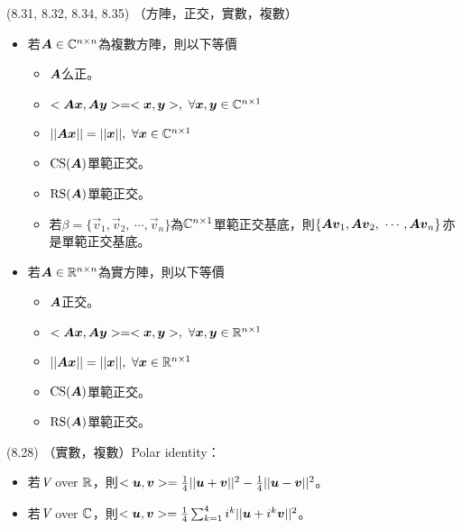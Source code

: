 \item \begin{theorem}{(8.31, 8.32, 8.34, 8.35)} （方陣，正交，實數，複數）
	\begin{itemize}
		\item 若$\boldsymbol{A} \in \mathbb{C}^{n \times n}$為複數方陣，則以下等價
		\begin{itemize}
			\item $\boldsymbol{A}$么正。
			\item $<\boldsymbol{A}\boldsymbol{x}, \boldsymbol{A}\boldsymbol{y}> = <\boldsymbol{x}, \boldsymbol{y}>, \ \forall \boldsymbol{x}, \boldsymbol{y} \in \mathbb{C}^{n \times 1}$
			\item $||\mat{A}\vec{x}|| = ||\vec{x}||, \ \forall \vec{x} \in \C^{n \times 1}$
			\item $\operatorname{CS}(\boldsymbol{A})$單範正交。
			\item $\operatorname{RS}(\boldsymbol{A})$單範正交。
			\item 若$\beta = \{\vec{v}_1, \vec{v}_2, \ \cdots, \vec{v}_n\}$為$\mathbb{C}^{n \times 1}$單範正交基底，則$\{\boldsymbol{A}\boldsymbol{v}_1, \boldsymbol{A}\boldsymbol{v}_2, \ \cdots, \boldsymbol{A}\boldsymbol{v}_n\}$亦是單範正交基底。			\end{itemize}
		\item 若$\boldsymbol{A} \in \mathbb{R}^{n \times n}$為實方陣，則以下等價
		\begin{itemize}
			\item $\boldsymbol{A}$正交。
			\item $<\boldsymbol{A}\boldsymbol{x}, \boldsymbol{A}\boldsymbol{y}> = <\boldsymbol{x}, \boldsymbol{y}>, \ \forall \boldsymbol{x}, \boldsymbol{y} \in \mathbb{R}^{n \times 1}$
			\item $||\mat{A}\vec{x}|| = ||\vec{x}||, \ \forall \vec{x} \in \R^{n \times 1}$
			\item $\operatorname{CS}(\boldsymbol{A})$單範正交。
			\item $\operatorname{RS}(\boldsymbol{A})$單範正交。
		\end{itemize}
	\end{itemize}
\end{theorem}

\item \begin{theorem}{(8.28)} （實數，複數）Polar identity：
	\begin{itemize}
		\item 若$\textit{V}$ over $\mathbb{R}$，則$<\boldsymbol{u}, \boldsymbol{v}> = \frac{1}{4}||\boldsymbol{u} + \boldsymbol{v}||^2 - \frac{1}{4}||\boldsymbol{u} - \boldsymbol{v}||^2$。
		\item 若$\textit{V}$ over $\mathbb{C}$，則$<\boldsymbol{u}, \boldsymbol{v}> = \frac{1}{4}\sum_{k = 1}^{4}i^k||\boldsymbol{u} + i^k\boldsymbol{v}||^2$。
	\end{itemize}
\end{theorem}

